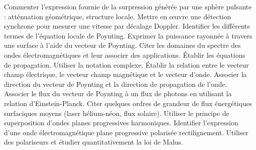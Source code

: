 \begin{competences}
    \point Commenter l'expression fournie de la surpression générée par une sphère pulsante : atténuation géométrique, structure locale.
    \point \faSignLanguage Mettre en œuvre une détection synchrone pour mesurer une vitesse par décalage Doppler.
    \point Identifier les différents termes de l’équation locale de Poynting.
    \point Exprimer la puissance rayonnée à travers une surface à l’aide du vecteur de Poynting.
    \point Citer les domaines du spectre des ondes électromagnétiques et leur associer des applications.
    \point Établir les équations de propagation.
    \point Utiliser la notation complexe.
    \point Établir la relation entre le vecteur champ électrique, le vecteur champ magnétique et le vecteur d’onde.
    \point Associer la direction du vecteur de Poynting et la direction de propagation de l’onde.
    \point Associer le flux du vecteur de Poynting à un flux de photons en utilisant la relation d’Einstein-Planck.
    \point Citer quelques ordres de grandeur de flux énergétiques surfaciques moyens (laser hélium-néon, flux solaire).
    \point Utiliser le principe de superposition d’ondes planes progressives harmoniques.
    \point Identifier l'expression d'une onde électromagnétique plane progressive polarisée rectilignement.
    \point \faSignLanguage Utiliser des polariseurs et étudier quantitativement la loi de Malus.
\end{competences}